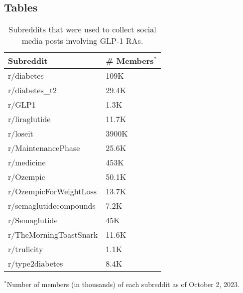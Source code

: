 \documentclass[referee,bst/sn-basic]{sn-jnl}%
\theoremstyle{thmstyletwo}%
\theoremstyle{thmstylethree}%
\begin{document}
\subsection*{Tables}
\begin{table}[h]
\caption{Subreddits that were used to collect social media posts involving GLP-1 RAs.}
\label{tbl:reddit}
\centering
\begin{tabular}{ll}
\toprule
Subreddit               & \# Members$^*$ \\
\midrule
r/diabetes            & 109K \\
r/diabetes\_t2            & 29.4K \\
r/GLP1       & 1.3K \\
r/liraglutide            & 11.7K \\
r/loseit         & 3900K \\
r/MaintenancePhase             & 25.6K \\
r/medicine           & 453K \\
r/Ozempic                  & 50.1K \\
r/OzempicForWeightLoss     & 13.7K \\
r/semaglutidecompounds           & 7.2K \\
r/Semaglutide              & 45K \\
r/TheMorningToastSnark              & 11.6K \\
r/trulicity              & 1.1K \\
r/type2diabetes           & 8.4K \\
\bottomrule
\end{tabular}
$^*$Number of members (in thousands) of each subreddit as of October 2, 2023.
\end{table}
\end{document}
